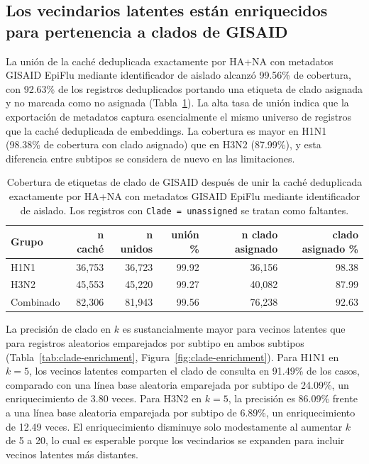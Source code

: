 \documentclass[11pt]{article}
\begin{document}
\subsection{Los vecindarios latentes están enriquecidos para pertenencia a clados de GISAID}

La unión de la caché deduplicada exactamente por HA+NA con metadatos GISAID EpiFlu mediante identificador de aislado alcanzó 99.56\% de cobertura, con 92.63\% de los registros deduplicados portando una etiqueta de clado asignada y no marcada como no asignada (Tabla~\ref{tab:clade-coverage}). La alta tasa de unión indica que la exportación de metadatos captura esencialmente el mismo universo de registros que la caché deduplicada de embeddings. La cobertura es mayor en H1N1 (98.38\% de cobertura con clado asignado) que en H3N2 (87.99\%), y esta diferencia entre subtipos se considera de nuevo en las limitaciones.

\begin{table}[H]
\centering
\caption{Cobertura de etiquetas de clado de GISAID después de unir la caché deduplicada exactamente por HA+NA con metadatos GISAID EpiFlu mediante identificador de aislado. Los registros con \texttt{Clade = unassigned} se tratan como faltantes.}
\label{tab:clade-coverage}
\begin{tabular}{lrrrrr}
\toprule
Grupo & n caché & n unidos & unión \% & n clado asignado & clado asignado \% \\
\midrule
H1N1 & 36,753 & 36,723 & 99.92 & 36,156 & 98.38 \\
H3N2 & 45,553 & 45,220 & 99.27 & 40,082 & 87.99 \\
Combinado & 82,306 & 81,943 & 99.56 & 76,238 & 92.63 \\
\bottomrule
\end{tabular}
\end{table}

La precisión de clado en $k$ es sustancialmente mayor para vecinos latentes que para registros aleatorios emparejados por subtipo en ambos subtipos (Tabla~\ref{tab:clade-enrichment}, Figura~\ref{fig:clade-enrichment}). Para H1N1 en $k=5$, los vecinos latentes comparten el clado de consulta en 91.49\% de los casos, comparado con una línea base aleatoria emparejada por subtipo de 24.09\%, un enriquecimiento de 3.80 veces. Para H3N2 en $k=5$, la precisión es 86.09\% frente a una línea base aleatoria emparejada por subtipo de 6.89\%, un enriquecimiento de 12.49 veces. El enriquecimiento disminuye solo modestamente al aumentar $k$ de 5 a 20, lo cual es esperable porque los vecindarios se expanden para incluir vecinos latentes más distantes.
\end{document}
